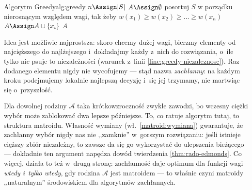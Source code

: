 \begin{alg}{Algorytm Greedy}{alg:greedy}
	\State $n \Assign |S|$
	\State $A \Assign \emptyset$ 
	\State posortuj $S$ w porządku nierosnącym względem wagi, tak żeby $w(x_1) \geq w(x_2) \geq \ldots \geq w(x_n)$
	 \label{line:greedy-niezaleznosc}
	\State $A \Assign A \cup \{x_i\}$
	\EndIf
	\EndFor
	\State \Return $A$
	\EndFunction
\end{alg}

\begin{dygresja}
	Idea jest możliwie najprostsza: skoro chcemy dużej wagi, bierzmy elementy od najcięższego do najlżejszego i~dokładajmy każdy z~nich do rozwiązania, o~ile tylko nie psuje to niezależności (warunek z~linii \ref{line:greedy-niezaleznosc}). Raz dodanego elementu nigdy nie wycofujemy --- stąd nazwa \emph{zachłanny}: na każdym kroku podejmujemy lokalnie najlepszą decyzję i~się jej trzymamy, nie martwiąc się o~przyszłość.

	Dla dowolnej rodziny $\mathcal{A}$ taka krótkowzroczność zwykle zawodzi, bo wczesny ciężki wybór może zablokować dwa lepsze późniejsze. To, co ratuje algorytm tutaj, to struktura matroidu. Własność wymiany (wł.\ \ref{matroid:wymiana}) gwarantuje, że zachłanny wybór nigdy nas nie ,,zamknie'' w~gorszym rozwiązaniu: jeśli istnieje cięższy zbiór niezależny, to zawsze da się go wykorzystać do ulepszenia bieżącego --- dokładnie ten argument napędza dowód twierdzenia \ref{thm:rado-edmonds}. Co więcej, działa to też w~drugą stronę: zachłanność daje optimum dla  funkcji wagi \emph{wtedy i~tylko wtedy}, gdy rodzina $\mathcal{A}$ jest matroidem --- to właśnie czyni matroidy ,,naturalnym'' środowiskiem dla algorytmów zachłannych.
\end{dygresja}

